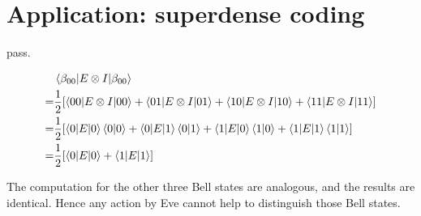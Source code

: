 \section{Application: superdense coding}

\ex pass.

\ex $$\begin{aligned}
    & \left\langle\beta_{00}\middle|E\otimes I\middle|\beta_{00}\right\rangle 
    \\ = & \frac{1}{2}[\left\langle00\middle|E\otimes I\middle|00\right\rangle+\left\langle01\middle|E\otimes I\middle|01\right\rangle+\left\langle10\middle|E\otimes I\middle|10\right\rangle+\left\langle11\middle|E\otimes I\middle|11\right\rangle]
    \\ = & \frac{1}{2}[\left\langle0\middle|E\middle|0\right\rangle\left\langle0\middle|0\right\rangle+\left\langle0\middle|E\middle|1\right\rangle\left\langle0\middle|1\right\rangle+\left\langle1\middle|E\middle|0\right\rangle\left\langle1\middle|0\right\rangle+\left\langle1\middle|E\middle|1\right\rangle\left\langle1\middle|1\right\rangle]
    \\ = & \frac{1}{2}[\left\langle0\middle|E\middle|0\right\rangle+\left\langle1\middle|E\middle|1\right\rangle]
\end{aligned}$$

The computation for the other three Bell states are analogous, and the results are identical.
Hence any action by Eve cannot help to distinguish those Bell states.
